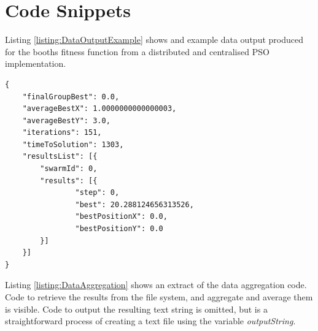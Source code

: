 \documentclass[oneside,12pt]{book}
\begin{document}



\appendix
\chapter{Code Snippets}
Listing \ref{listing:DataOutputExample} shows and example data output produced for the booths fitness function from a distributed and centralised PSO implementation. 
\begin{lstlisting}
{
	"finalGroupBest": 0.0,
	"averageBestX": 1.0000000000000003,
	"averageBestY": 3.0,
	"iterations": 151,
	"timeToSolution": 1303,
	"resultsList": [{
		"swarmId": 0,
		"results": [{
				"step": 0,
				"best": 20.288124656313526,
				"bestPositionX": 0.0,
				"bestPositionY": 0.0
		}]
	}]
}
\end{lstlisting}
\label{listing:DataOutputExample}

Listing \ref{listing:DataAggregation} shows an extract of the data aggregation code. Code to retrieve the results from the file system, and aggregate and average them is visible. Code to output the resulting text string is omitted, but is a straightforward process of creating a text file using the variable \textit{outputString}.
\end{document}
